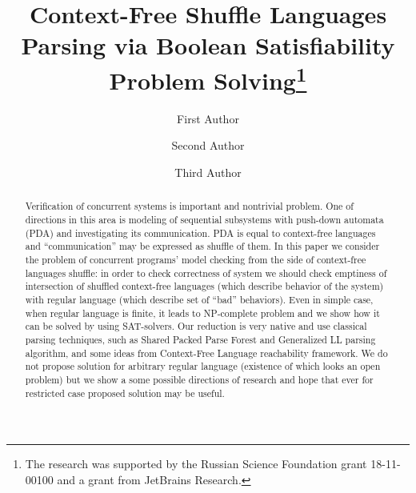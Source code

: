 \documentclass[runningheads]{llncs}
\begin{document}
%
\title{Context-Free Shuffle Languages Parsing via Boolean Satisfiability Problem Solving\thanks{The research was supported by the Russian Science Foundation grant 18-11-00100 and a grant from JetBrains Research.}}
%
%
\author{First Author \and
Second Author \and
Third Author}
%
%
%
\maketitle              %
%
\begin{abstract}
    Verification of concurrent systems is important and nontrivial problem.
    One of directions in this area is modeling of sequential subsystems with push-down automata (PDA) and investigating its communication.
    PDA is equal to context-free languages and ``communication'' may be expressed as shuffle of them.
    In this paper we consider the problem of concurrent programs' model checking from the side of context-free languages shuffle:
    in order to check correctness of system we should check emptiness of intersection of shuffled context-free languages (which describe behavior of the system) with regular language (which describe set of ``bad'' behaviors).
    Even in simple case, when regular language is finite, it leads to NP-complete problem and we show how it can be solved by using SAT-solvers.
    Our reduction is very native and use classical parsing techniques, such as Shared Packed Parse Forest and Generalized LL parsing algorithm, and some ideas from Context-Free Language reachability framework.
    We do not propose solution for arbitrary regular language (existence of which looks an open problem) but we show a some possible directions of research and hope that ever for restricted case proposed solution may be useful.


\end{abstract}
%
%
%
\end{document}
